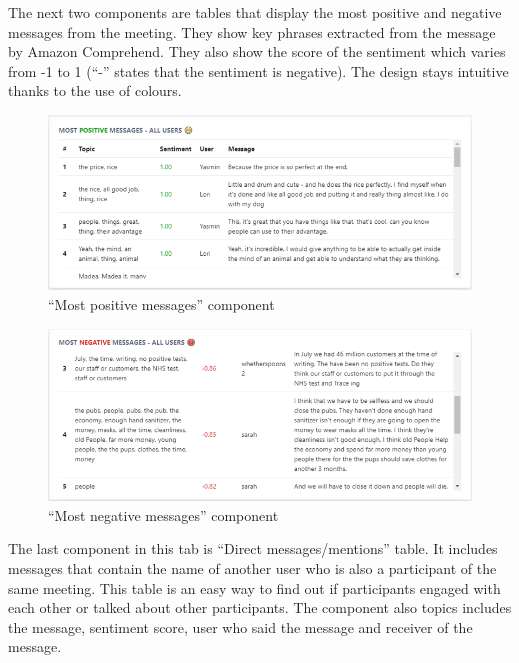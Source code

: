 \documentclass{article}
\begin{document}
{\large 
The next two components are tables that display the most positive and negative messages from the meeting. They show key phrases extracted from the message by Amazon Comprehend. They also show the score of the sentiment which varies from -1 to 1 (``-'' states that the sentiment is negative). The design stays intuitive thanks to the use of colours.\par
}

\newpage

\vspace{10pt}

\begin{figure}[H]
  \centering
  \includegraphics[scale=0.71]{charts/positive.png}
  \caption{``Most positive messages'' component}
  \label{fig:positive}
\end{figure}

\begin{figure}[H]
  \centering
  \includegraphics[scale=0.7]{charts/negative.png}
  \caption{``Most negative messages'' component}
  \label{fig:negative}
\end{figure}

{\large 
The last component in this tab is ``Direct messages/mentions'' table. It includes messages that contain the name of another user who is also a participant of the same meeting. This table is an easy way to find out if participants engaged with each other or talked about other participants. The component also topics includes the message, sentiment score, user who said the message and receiver of the message.\par
}
\end{document}
